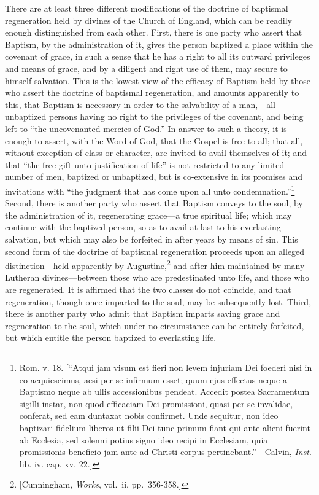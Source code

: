 \documentclass[]{book}
\begin{document}
There are at least three different modifications of the doctrine of baptismal regeneration held by divines of the Church of England, which can be readily enough distinguished from each other. First, there is one party who assert that Baptism, by the administration of it, gives the person baptized a place within the covenant of grace, in such a sense that he has a right to all its outward privileges and means of grace, and by a diligent and right use of them, may secure to himself salvation. This is the lowest view of the efficacy of Baptism held by those who assert the doctrine of baptismal regeneration, and amounts apparently to this, that Baptism is necessary in order to the salvability of a man,---all unbaptized persons having no right to the privileges of the covenant, and being left to ``the uncovenanted mercies of God.'' In answer to such a theory, it is enough to assert, with the Word of God, that the Gospel is free to all; that all, without exception of class or character, are invited to avail themselves of it; and that ``the free gift unto justification of life'' is not restricted to any limited number of men, baptized or unbaptized, but is co-extensive in its promises and invitations with ``the judgment that has come upon all unto condemnation.''\footnote{Rom. v. 18. {[}``Atqui jam visum est fieri non levem injuriam Dei foederi nisi in eo acquiescimus, aesi per se infirmum esset; quum ejus effectus neque a Baptismo neque ab ullis accessionibus pendeat. Accedit postea Sacramentum sigilli instar, non quod efficaciam Dei promissioni, quasi per se invalidae, conferat, sed eam duntaxat nobis confirmet. Unde sequitur, non ideo baptizari fidelium liberos ut filii Dei tunc primum fiant qui ante alieni fuerint ab Ecclesia, sed solenni potius signo ideo recipi in Ecclesiam, quia promissionis beneficio jam ante ad Christi corpus pertinebant.''---Calvin, \emph{Inst}. lib. iv. cap. xv. 22.{]}} Second, there is another party who assert that Baptism conveys to the soul, by the administration of it, regenerating grace---a true spiritual life; which may continue with the baptized person, so as to avail at last to his everlasting salvation, but which may also be forfeited in after years by means of sin. This second form of the doctrine of baptismal regeneration proceeds upon an alleged distinction---held apparently by Augustine,\footnote{{[}Cunningham, \emph{Works}, vol.~ii. pp.~356-358.{]}} and after him maintained by many Lutheran divines---between those who are predestinated unto life, and those who are regenerated. It is affirmed that the two classes do not coincide, and that regeneration, though once imparted to the soul, may be subsequently lost. Third, there is another party who admit that Baptism imparts saving grace and regeneration to the soul, which under no circumstance can be entirely forfeited, but which entitle the person baptized to everlasting life.
\end{document}

